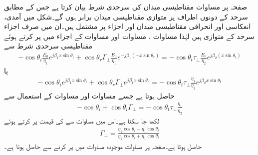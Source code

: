 صفحہ  پر  مساوات  مقناطیسی میدان کی سرحدی شرط بیان کرتا ہے جس کے مطابق سرحد کے دونوں اطراف پر متوازی مقناطیسی میدان برابر ہوں گے۔شکل  میں آمدی، انعکاسی اور انحرافی مقناطیسی میدان  اور  اجزاء  پر مشتمل ہیں۔ان میں صرف  اجزاء سرحد کے متوازی ہیں لہٰذا مساوات ، مساوات  اور مساوات  کے  اجزاء میں  پر کرتے ہوئے مقناطیسی سرحدی شرط سے  
\begin{align*}
 -\cos \theta_i \frac{E_0}{\eta_1} e^{j\beta_1 x\sin \theta_i }+\cos \theta_r \Gamma_{\perp} \frac{ E_0}{\eta_1} e^{-j \beta_1 (-x \sin \theta_r)}=-\cos \theta_t  \tau_{\perp} \frac{E_0}{\eta_2} e^{j \beta_2 (x \sin \theta_t)}
\end{align*}
یا
\begin{align*}
 -\cos \theta_i  e^{j\beta_1 x\sin \theta_i }+\cos \theta_r \Gamma_{\perp}  e^{j \beta_1 x \sin \theta_r}=-\cos \theta_t  \tau_{\perp} \frac{\eta_1}{\eta_2} e^{j \beta_2  x \sin \theta_t}
\end{align*}
حاصل ہوتا ہے جسے مساوات  اور مساوات  کے استعمال سے
\begin{align*}
 -\cos \theta_i +\cos \theta_i \Gamma_{\perp} =-\cos \theta_t  \tau_{\perp} \frac{\eta_1}{\eta_2}
\end{align*}
لکھا جا سکتا ہے۔اس میں مساوات  سے  کی قیمت پر کرتے ہوئے
\begin{align}
\Gamma_{\perp}=\frac{\eta_2 \cos \theta_i -\eta_1 \cos \theta_t}{\eta_2 \cos \theta_i +\eta_1 \cos \theta_t}
\end{align}
حاصل ہوتا ہے۔صفحہ  پر مساوات  موجودہ مساوات میں  پر کرنے سے حاصل ہوتا ہے۔

